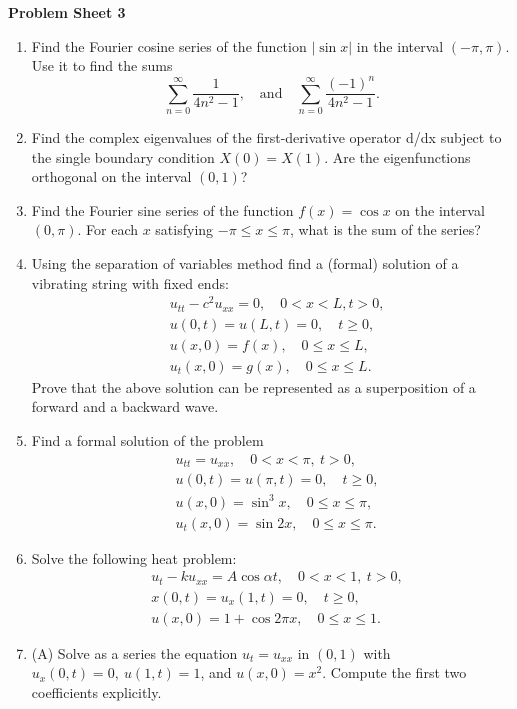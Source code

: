 \documentclass[11pt,a4paper]{article}
\begin{document}
	\begin{center}
		\textbf{Problem Sheet 3}
	\end{center}
	\begin{enumerate}
		\item Find the Fourier cosine series of the function $|\sin x|$ in the interval $(−\pi, \pi)$. Use it to find the sums
		$$
		\sum_{n = 0}^\infty \frac{1}{4n^2 - 1},\quad \text{and}\quad \sum_{n=0}^\infty \frac{(-1)^n}{4n^2 - 1}.
		$$
		\item Find the complex eigenvalues of the first-derivative operator d/dx subject to the single boundary condition $X(0) = X(1)$. Are the eigenfunctions orthogonal on the interval $(0, 1)$?
		\item Find the Fourier sine series of the function $f(x) = \cos x$ on the interval $(0, \pi)$. For each $x$ satisfying $-\pi \leq x \leq \pi$, what is the sum of the series?
		\item Using the separation of variables method find a (formal) solution of a vibrating string with fixed ends:
		\begin{align*}
			&u_{tt} - c^2u_{xx} = 0,\quad 0 < x < L, t > 0,\\
			&u(0, t) = u(L, t) = 0,\quad t \geq 0,\\
			&u(x, 0) = f(x),\quad 0 \leq x \leq L,\\
			&u_t(x, 0) = g(x),\quad 0 \leq x \leq L.
		\end{align*}
		Prove that the above solution can be represented as a superposition of a forward and a backward wave.
		\item Find a formal solution of the problem
		\begin{align*}
			& u_{tt} = u_{xx},\quad 0 < x < \pi,\ t > 0,\\
			& u(0, t) = u(\pi, t) = 0,\quad t \geq 0,\\
			& u(x, 0) = \sin^3 x,\quad 0 \leq x \leq \pi,\\
			& u_t(x, 0) = \sin 2x,\quad 0 \leq x \leq \pi.
		\end{align*}
		\item Solve the following heat problem:
		\begin{align*}
			& u_t - ku_{xx} = A \cos \alpha t,\quad 0 < x < 1,\ t > 0,\\
			& x(0, t) = u_x(1, t) = 0,\quad t \geq 0,\\
			& u(x, 0) = 1 + \cos 2\pi x,\quad 0 \leq x \leq 1.
		\end{align*}
		\item (A) Solve as a series the equation $u_t = u_{xx}$ in $(0, 1)$ with $u_x(0, t) = 0,\ u(1, t) = 1$, and $u(x, 0) = x^2$. Compute the first two coefficients explicitly.\\

\end{enumerate}
\end{document}
